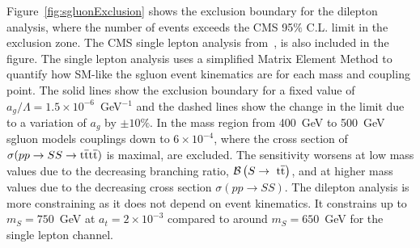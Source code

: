 




Figure~\ref{fig:sgluonExclusion} shows the exclusion boundary for the dilepton analysis, where the number of events exceeds the CMS 95$\%$ C.L. limit in the exclusion zone. The CMS single lepton analysis from~\cite{Chatrchyan:2013fea,Beck201548}, is also included in the figure. The single lepton analysis uses a simplified Matrix Element Method to quantify how SM-like the sgluon event kinematics are for each mass and coupling point. The solid lines show the exclusion boundary for a fixed value of $a_{g}/\Lambda = 1.5 \times 10^{-6}$~GeV$^{-1}$ and the dashed lines show the change in the limit due to a variation of $a_{g}$ by $\pm 10\%$. 
In the mass region from 400~GeV to 500~GeV sgluon models couplings down to $6\times10^{-4}$, where the cross section of $\sigma( pp \rightarrow SS \rightarrow \mathrm{t}\overline{\mathrm{t}}\mathrm{t}\overline{\mathrm{t}})$ is maximal, are excluded. The sensitivity worsens at low mass values due to the decreasing branching ratio, $\mathcal{B}\left(S\rightarrow~\mathrm{t}\overline{\mathrm{t}} \right)$, and at higher mass values due to the decreasing cross section $\sigma( pp \rightarrow SS)$.
The dilepton analysis is more constraining as it does not depend on event kinematics. It constrains up to $ m_{S} = 750$~GeV at $a_t=2\times10^{-3}$ compared to around $ m_{S} = 650$~GeV for the single lepton channel.

